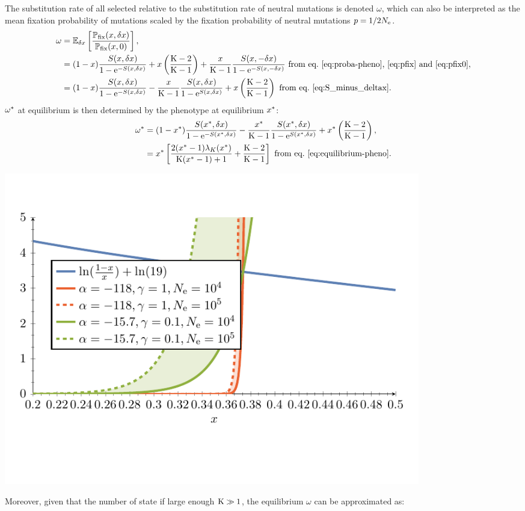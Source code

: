 \documentclass{article}
\begin{document}
The {substitution} rate of all selected relative to the {substitution} rate of {neutral} mutations is denoted $\omega$, which can also be interpreted as the mean fixation probability of mutations scaled by the fixation probability of {neutral} mutations $p = 1 / {2 N_{\text{e}}}$.
\begin{align}
    \omega & = \operatorname{\mathbb{E}}_{\delta x} \left[ \frac{\mathbb{P}_{\text{fix}}(x, \delta x)}{\mathbb{P}_{\text{fix}}(x, 0)} \right], \\
    & = (1 - x) \frac{ S(x, \delta x)}{1 - \text{e}^{-S(x, \delta x)}} + x \left(\frac{\text{K} - 2}{\text{K} - 1}\right) + \frac{x}{\text{K}-1} \frac{ S(x, -\delta x)}{1 - \text{e}^{-S(x, -\delta x)}} \text{ from eq.~\ref{eq:proba-pheno},~\ref{eq:pfix} and~\ref{eq:pfix0}}, \\
    & = (1 - x) \frac{ S(x, \delta x)}{1 - \text{e}^{-S(x, \delta x)}} - \frac{x}{\text{K}-1}  \frac{ S(x, \delta x)}{1 - \text{e}^{S(x, \delta x)}} + x \left(\frac{\text{K} - 2}{\text{K} - 1}\right) \text{ from eq.~\ref{eq:S_minus_deltax}}.
\end{align}
$\omega^{*}$ at equilibrium is then determined by the {phenotype} at equilibrium $x^{*}$:
\begin{align}
    \omega^{*} &= (1 - x^{*}) \frac{ S(x^{*}, \delta x)}{1 - \text{e}^{-S(x^{*}, \delta x)}} - \frac{x^{*}}{\text{K}-1} \frac{ S(x^{*}, \delta x)}{1 - \text{e}^{S(x^{*}, \delta x)}} + x^{*} \left(\frac{\text{K} - 2}{\text{K} - 1}\right) , \\
    &= x^{*} \left[ \frac{2 (x^{*}-1)  \lambda_{K}(x^{*}) }{\text{K} (x^{*}-1)+1} + \frac{\text{K} - 2}{\text{K} - 1}\right] \text{ from eq.~\ref{eq:equilibrium-pheno}}.
\end{align}
\begin{center}
    \includegraphics[width=0.8\textwidth, page=2] {analytical-relaxation}
\end{center}
Moreover, given that the number of state if large enough $\text{K} \gg 1$, the equilibrium $\omega$ can be approximated as:
\end{document}
